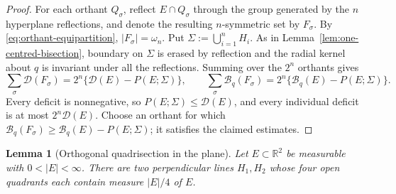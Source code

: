 \documentclass[11pt]{amsart}
\newtheorem{lemma}[theorem]{Lemma}
\theoremstyle{definition}
\newcommand{\R}{\mathbb R}
\newcommand{\Per}{P}
\newcommand{\Def}{\mathcal D}
\begin{document}
\begin{proof}
For each orthant \(Q_\sigma\), reflect \(E\cap Q_\sigma\) through the
group generated by the \(n\) hyperplane reflections, and denote the
resulting \(n\)-symmetric set by \(F_\sigma\).  By
\eqref{eq:orthant-equipartition}, \(|F_\sigma|=\omega_n\).  Put
\(\Sigma:=\bigcup_{i=1}^nH_i\).  As in
Lemma~\ref{lem:one-centred-bisection}, boundary on \(\Sigma\) is
erased by reflection and the radial kernel about \(q\) is invariant
under all the reflections.  Summing over the \(2^n\) orthants gives
\[
   \sum_\sigma\Def(F_\sigma)
      =2^n\{\Def(E)-\Per(E;\Sigma)\},
   \qquad
   \sum_\sigma\mathcal B_q(F_\sigma)
      =2^n\{\mathcal B_q(E)-\Per(E;\Sigma)\}.
\]
Every deficit is nonnegative, so
\(\Per(E;\Sigma)\le\Def(E)\), and every individual deficit is at most
\(2^n\Def(E)\).  Choose an orthant for which
\(\mathcal B_q(F_\sigma)\ge
\mathcal B_q(E)-\Per(E;\Sigma)\); it satisfies the claimed estimates.
\end{proof}

\begin{lemma}[Orthogonal quadrisection in the plane]
\label{lem:orthogonal-quadrisection}
Let \(E\subset\R^2\) be measurable with \(0<|E|<\infty\).  There are
two perpendicular lines \(H_1,H_2\) whose four open quadrants each
contain measure \(|E|/4\) of \(E\).
\end{lemma}
\end{document}
